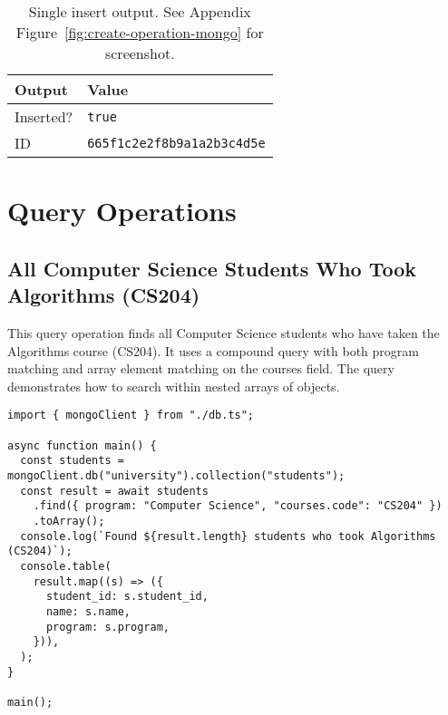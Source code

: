 \begin{table}[H]
  \centering
  \begin{tabular}{|l|l|}
    \hline
    \textbf{Output} & \textbf{Value} \\
    \hline
    Inserted? & \texttt{true} \\
    ID & \texttt{665f1c2e2f8b9a1a2b3c4d5e} \\
    \hline
  \end{tabular}
  \caption{Single insert output. See Appendix Figure~\ref{fig:create-operation-mongo} for screenshot.}
\end{table}

\section{Query Operations}

\subsection{All Computer Science Students Who Took Algorithms (CS204)}
This query operation finds all Computer Science students who have taken the Algorithms course (CS204). It uses a compound query with both program matching and array element matching on the courses field. The query demonstrates how to search within nested arrays of objects.

\begin{verbatim}
import { mongoClient } from "./db.ts";

async function main() {
  const students = mongoClient.db("university").collection("students");
  const result = await students
    .find({ program: "Computer Science", "courses.code": "CS204" })
    .toArray();
  console.log(`Found ${result.length} students who took Algorithms (CS204)`);
  console.table(
    result.map((s) => ({
      student_id: s.student_id,
      name: s.name,
      program: s.program,
    })),
  );
}

main();
\end{verbatim}

